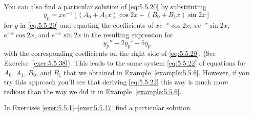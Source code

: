 \begin{examplesolution}
You can also find a particular solution of \eqref{eq:5.5.20} by substituting
\[
  y_{p}=xe^{-x}\left[(A_{0}+A_{1}x)\cos2x+(B_{0}+B_{1}x)\sin2x\right]
\]
for $y$ in \eqref{eq:5.5.20} and equating the coefficients of $xe^{-x}\cos2x$, $xe^{-x}\sin2x$,
$e^{-x}\cos2x$, and $e^{-x}\sin2x$ in the resulting expression for
\[
  y_{p}''+2y_{p}'+5y_{p}
\]
with the corresponding coefficients on the right side of \eqref{eq:5.5.20}. (See
Exercise~\ref{exer:5.5.38}). This leads to the same system \eqref{eq:5.5.22} of equations for
$A_{0}$, $A_{1}$, $B_{0}$, and $B_{1}$ that we obtained in Example~\ref{example:5.5.6}. However, if
you try this approach you'll see that deriving \eqref{eq:5.5.22} this way is much more tedious than
the way we did it in Example~\ref{example:5.5.6}.
\end{examplesolution}

\exercises In Exercises \ref{exer:5.5.1}--\ref{exer:5.5.17} find a particular solution.

